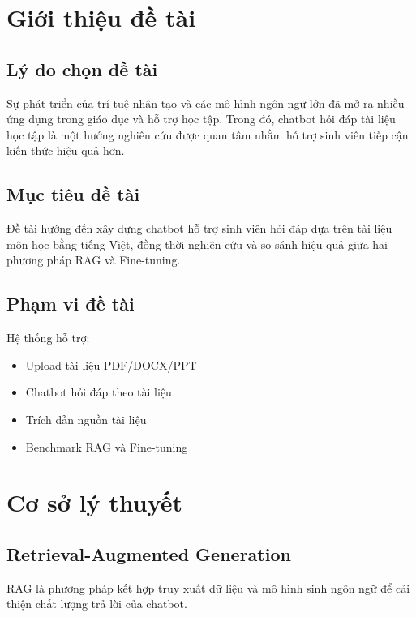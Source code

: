 \documentclass[12pt,a4paper]{report}
\begin{document}
	\chapter{Giới thiệu đề tài}
	
	\section{Lý do chọn đề tài}
	
	Sự phát triển của trí tuệ nhân tạo và các mô hình ngôn ngữ lớn đã mở ra nhiều ứng dụng trong giáo dục và hỗ trợ học tập. Trong đó, chatbot hỏi đáp tài liệu học tập là một hướng nghiên cứu được quan tâm nhằm hỗ trợ sinh viên tiếp cận kiến thức hiệu quả hơn.
	
	\section{Mục tiêu đề tài}
	
	Đề tài hướng đến xây dựng chatbot hỗ trợ sinh viên hỏi đáp dựa trên tài liệu môn học bằng tiếng Việt, đồng thời nghiên cứu và so sánh hiệu quả giữa hai phương pháp RAG và Fine-tuning.
	
	\section{Phạm vi đề tài}
	
	Hệ thống hỗ trợ:
	\begin{itemize}
		\item Upload tài liệu PDF/DOCX/PPT
		\item Chatbot hỏi đáp theo tài liệu
		\item Trích dẫn nguồn tài liệu
		\item Benchmark RAG và Fine-tuning
	\end{itemize}
	
	\chapter{Cơ sở lý thuyết}
	
	\section{Retrieval-Augmented Generation}
	
	RAG là phương pháp kết hợp truy xuất dữ liệu và mô hình sinh ngôn ngữ để cải thiện chất lượng trả lời của chatbot.
	
\end{document}
